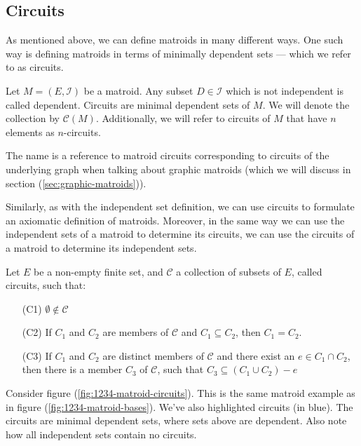 \subsection{Circuits}\label{sec:circuits}
As mentioned above, we can define matroids in many different ways. One such way is defining matroids in terms of minimally dependent sets --- which we refer to as circuits.

\begin{defn}
Let $M = (E, \mathcal{I})$ be a matroid. Any subset $D \in \mathcal{I}$ which is not independent is called dependent. Circuits are minimal dependent sets of $M$. We will denote the collection by $\mathcal{C}(M)$. Additionally, we will refer to circuits of $M$ that have $n$ elements as $n$-circuits.
\end{defn}

The name is a reference to matroid circuits corresponding to circuits of the underlying graph when talking about graphic matroids (which we will discuss in section (\ref{sec:graphic-matroids})).

Similarly, as with the independent set definition, we can use circuits to formulate an axiomatic definition of matroids. Moreover, in the same way we can use the independent sets of a matroid to determine its circuits, we can use the circuits of a matroid to determine its independent sets.

\begin{defn}
    Let $E$ be a non-empty finite set, and $\mathcal{C}$ a collection of subsets of $E$, called circuits, such that:

    \begin{enumerate}
      \item[(C1)] $\emptyset \notin \mathcal{C}$

        \item[(C2)] If $C_1$ and $C_2$ are members of $\mathcal{C}$ and $C_1 \subseteq C_2$, then $C_1 = C_2$.

        \item[(C3)] If $C_1$ and $C_2$ are distinct members of $\mathcal{C}$ and there exist an $e \in C_1 \cap C_2$, then there is a member $C_3$ of $\mathcal{C}$, such that $C_3 \subseteq (C_1  \cup C_2) - e$
    \end{enumerate}
    
\end{defn}

\begin{exmp}
  Consider figure (\ref{fig:1234-matroid-circuits}). This is the same matroid example as in figure (\ref{fig:1234-matroid-bases}). We've also highlighted circuits (in blue). The circuits are minimal dependent sets, where sets above are dependent. Also note how all independent sets contain no circuits.
\end{exmp}

